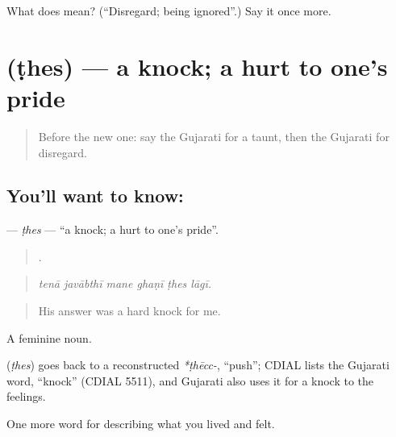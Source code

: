 \begin{tcolorbox}[breakable,colback=teal!4,colframe=teal!35!black,title={Before you move on}]
What does  mean? (\textquotedblleft{}Disregard; being ignored\textquotedblright{}.) Say it once more.
\end{tcolorbox}
\section[\texorpdfstring{\gu{ઠેસ} (ṭhes)}{ઠેસ (ṭhes)}]{ (ṭhes) — a knock; a hurt to one's pride}

\label{lesson:GU-C456-thes}



\begin{quote}
Before the new one: say the Gujarati for a taunt, then the Gujarati for disregard.
\end{quote}

\subsection*{You'll want to know: }
\textbf{} — \emph{ṭhes} — \textquotedblleft{}a knock; a hurt to one's pride\textquotedblright{}.

\begin{quote}
     .
\end{quote}

\begin{quote}
\emph{tenā javābthī mane ghaṇī ṭhes lāgī.}
\end{quote}

\begin{quote}
His answer was a hard knock for me.
\end{quote}

A feminine noun.

\begin{cousinweb}
\textbf{} (\emph{ṭhes}) goes back to a reconstructed \emph{*ṭhēcc-}, \textquotedblleft{}push\textquotedblright{}; CDIAL lists the Gujarati word, \textquotedblleft{}knock\textquotedblright{} (CDIAL 5511), and Gujarati also uses it for a knock to the feelings.
\end{cousinweb}

\begin{grammarlens}[title={What you've built}]
One more word for describing what you lived and felt.
\end{grammarlens}

